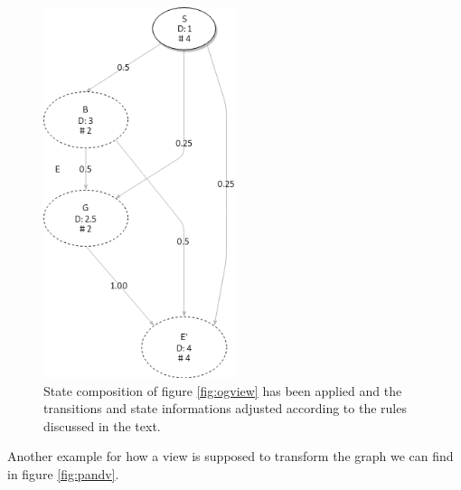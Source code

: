 \begin{figure}[hb]
    \centering
    \includegraphics[width=0.5\textwidth]{Diagrams/Statecharts/statemachine_view1.png}
    \caption{State composition of figure \ref{fig:ogview} has been applied and the transitions and state informations adjusted according to the rules discussed in the text.}
    \label{fig:view1}
\end{figure}

Another example for how a view is supposed to transform the graph we can find in figure \ref{fig:pandv}.

